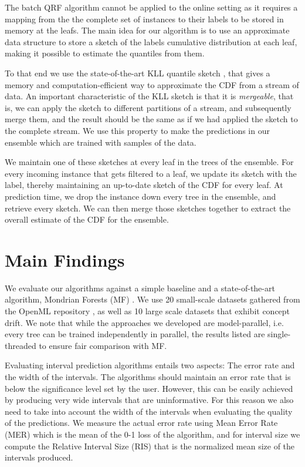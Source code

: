 The batch QRF algorithm cannot be applied to the online setting as it requires
a mapping from the the complete set of instances to their labels to be stored
in memory at the leafs. The main idea for our algorithm is to use an approximate data
structure to store a sketch of the labels cumulative distribution at each leaf,
making it possible to estimate the quantiles from them.

To that end we use the state-of-the-art KLL quantile sketch \cite{karnin2016kll},
that gives a memory and computation-efficient way to approximate the CDF from
a stream of data. An important characteristic of the KLL sketch is that it is
\emph{mergeable}, that is, we can apply the sketch to different partitions of
a stream, and subsequently merge them, and the result should be the same
as if we had applied the sketch to the complete stream. We use this property
to make the predictions in our ensemble which are trained with samples of the
data.

We maintain  one of these sketches at every leaf in the trees of the ensemble.
For every incoming instance that gets filtered to a leaf, we update its sketch
with the label, thereby maintaining an up-to-date sketch of the CDF for every
leaf. At prediction time, we drop the instance
down every tree in the ensemble, and retrieve every sketch.
We can then merge those sketches together to extract the overall estimate
of the CDF for the ensemble.

\section{Main Findings}
\label{sec:uncertain-trees-results}

We evaluate our algorithms against a simple baseline and a state-of-the-art
algorithm, Mondrian Forests (MF) \cite{mondrian-forests-original}. We use 20 small-scale
datasets gathered from the OpenML repository \cite{vanschoren2013openml}, as well
as 10 large scale datasets that exhibit concept drift. We note that while the approaches we developed are model-parallel, i.e.
every tree can be trained independently in parallel, the results listed are single-threaded
to ensure fair comparison with MF.

Evaluating interval prediction algorithms entails two aspects: The error rate
and the width of the intervals. The algorithms should maintain an error rate
that is below the significance level set by the user. However, this can be
easily achieved by producing very wide intervals that are uninformative.
For this reason we also need to take into account the width of  the intervals when
evaluating the quality of the predictions. We measure the actual error rate using Mean Error Rate (MER)
which is the mean of the 0-1 loss of the algorithm, and for interval size we compute
the Relative Interval Size (RIS) that
is the normalized mean size of the intervals produced.

